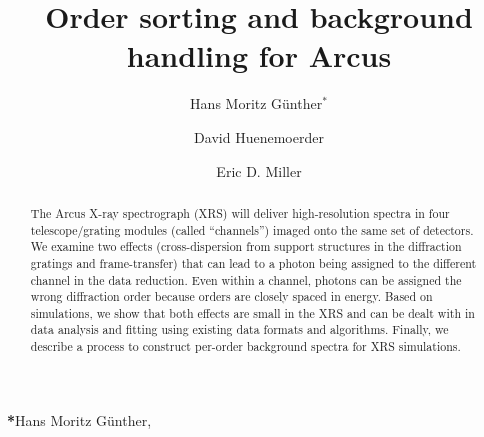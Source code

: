 \documentclass[12pt]{spieman}  %
\title{Order sorting and background handling for Arcus}
\author[a]{Hans Moritz G\"unther$^*$}
\author[a]{David Huenemoerder}
\author[a]{Eric D. Miller}
\affil[a]{MIT Kavli Institute for Astrophysics and Space Research, Cambridge, MA 02139, USA}
\begin{document}
\maketitle

\begin{abstract}
The Arcus X-ray spectrograph (XRS) will deliver high-resolution spectra in four telescope/grating modules (called ``channels'') imaged onto the same set of detectors. We examine two effects (cross-dispersion from support structures in the diffraction gratings and frame-transfer) that can lead to a photon being assigned to the different channel in the data reduction. Even within a channel, photons can be assigned the wrong diffraction order because orders are closely spaced in energy. Based on simulations, we show that both effects are small in the XRS and can be dealt with in data analysis and fitting using existing data formats and algorithms. Finally, we describe a process to construct per-order background spectra for XRS simulations.
\end{abstract}


{\noindent \footnotesize\textbf{*}Hans Moritz G\"unther,   }
\end{document}
